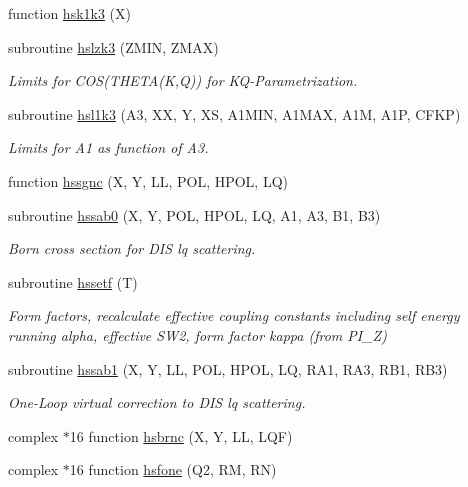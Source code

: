 \begin{DoxyCompactItemize}
function \hyperlink{djangoh__h_8f_a53c5a7b73ac0147b97ff74b75f5ae5bb}{hsk1k3} (X)
\item 
subroutine \hyperlink{djangoh__h_8f_a2857c36abf6cf55c0980cfaa59a9f348}{hslzk3} (Z\+M\+IN, Z\+M\+AX)
\begin{DoxyCompactList}\small\item\em Limits for C\+O\+S(\+T\+H\+E\+T\+A(\+K,\+Q)) for K\+Q-\/\+Parametrization. \end{DoxyCompactList}\item 
subroutine \hyperlink{djangoh__h_8f_a3a4516117594d1ccca1c03af99d73875}{hsl1k3} (A3, XX, Y, XS, A1\+M\+IN, A1\+M\+AX, A1M, A1P, C\+F\+KP)
\begin{DoxyCompactList}\small\item\em Limits for A1 as function of A3. \end{DoxyCompactList}\item 
function \hyperlink{djangoh__h_8f_a8df1ca1337492f14b9737435536efb25}{hssgnc} (X, Y, LL, P\+OL, H\+P\+OL, LQ)
\item 
subroutine \hyperlink{djangoh__h_8f_aa4a5469528c1a861aede141deda31ef9}{hssab0} (X, Y, P\+OL, H\+P\+OL, LQ, A1, A3, B1, B3)
\begin{DoxyCompactList}\small\item\em Born cross section for D\+IS lq scattering. \end{DoxyCompactList}\item 
subroutine \hyperlink{djangoh__h_8f_a56a21f2f4c8f198faf695976bb121eb2}{hssetf} (T)
\begin{DoxyCompactList}\small\item\em Form factors, recalculate effective coupling constants including self energy running alpha, effective S\+W2, form factor kappa (from P\+I\+\_\+Z) \end{DoxyCompactList}\item 
subroutine \hyperlink{djangoh__h_8f_ae79d168be183460bb3a8f1ba4f6f983c}{hssab1} (X, Y, LL, P\+OL, H\+P\+OL, LQ, R\+A1, R\+A3, R\+B1, R\+B3)
\begin{DoxyCompactList}\small\item\em One-\/\+Loop virtual correction to D\+IS lq scattering. \end{DoxyCompactList}\item 
complex $\ast$16 function \hyperlink{djangoh__h_8f_aad43c59ee9357789a332bbb961d55a34}{hsbrnc} (X, Y, LL, L\+QF)
\item 
complex $\ast$16 function \hyperlink{djangoh__h_8f_aa5192bede58469d1b57ed2aa1ee4b27b}{hsfone} (Q2, RM, RN)

\end{DoxyCompactItemize}

